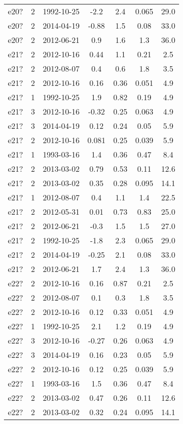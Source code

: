 \begin{table*}[htp]
\begin{tabular}{ccccccc}
e20? & 2 & 1992-10-25 & -2.2 & 2.4 & 0.065 & 29.0 \\
e20? & 2 & 2014-04-19 & -0.88 & 1.5 & 0.08 & 33.0 \\
e20? & 2 & 2012-06-21 & 0.9 & 1.6 & 1.3 & 36.0 \\
e21? & 2 & 2012-10-16 & 0.44 & 1.1 & 0.21 & 2.5 \\
e21? & 2 & 2012-08-07 & 0.4 & 0.6 & 1.8 & 3.5 \\
e21? & 2 & 2012-10-16 & 0.16 & 0.36 & 0.051 & 4.9 \\
e21? & 1 & 1992-10-25 & 1.9 & 0.82 & 0.19 & 4.9 \\
e21? & 3 & 2012-10-16 & -0.32 & 0.25 & 0.063 & 4.9 \\
e21? & 3 & 2014-04-19 & 0.12 & 0.24 & 0.05 & 5.9 \\
e21? & 2 & 2012-10-16 & 0.081 & 0.25 & 0.039 & 5.9 \\
e21? & 1 & 1993-03-16 & 1.4 & 0.36 & 0.47 & 8.4 \\
e21? & 2 & 2013-03-02 & 0.79 & 0.53 & 0.11 & 12.6 \\
e21? & 2 & 2013-03-02 & 0.35 & 0.28 & 0.095 & 14.1 \\
e21? & 1 & 2012-08-07 & 0.4 & 1.1 & 1.4 & 22.5 \\
e21? & 2 & 2012-05-31 & 0.01 & 0.73 & 0.83 & 25.0 \\
e21? & 2 & 2012-06-21 & -0.3 & 1.5 & 1.5 & 27.0 \\
e21? & 2 & 1992-10-25 & -1.8 & 2.3 & 0.065 & 29.0 \\
e21? & 2 & 2014-04-19 & -0.25 & 2.1 & 0.08 & 33.0 \\
e21? & 2 & 2012-06-21 & 1.7 & 2.4 & 1.3 & 36.0 \\
e22? & 2 & 2012-10-16 & 0.16 & 0.87 & 0.21 & 2.5 \\
e22? & 2 & 2012-08-07 & 0.1 & 0.3 & 1.8 & 3.5 \\
e22? & 2 & 2012-10-16 & 0.12 & 0.33 & 0.051 & 4.9 \\
e22? & 1 & 1992-10-25 & 2.1 & 1.2 & 0.19 & 4.9 \\
e22? & 3 & 2012-10-16 & -0.27 & 0.26 & 0.063 & 4.9 \\
e22? & 3 & 2014-04-19 & 0.16 & 0.23 & 0.05 & 5.9 \\
e22? & 2 & 2012-10-16 & 0.12 & 0.25 & 0.039 & 5.9 \\
e22? & 1 & 1993-03-16 & 1.5 & 0.36 & 0.47 & 8.4 \\
e22? & 2 & 2013-03-02 & 0.47 & 0.26 & 0.11 & 12.6 \\
e22? & 2 & 2013-03-02 & 0.32 & 0.24 & 0.095 & 14.1 \\

\end{tabular}
\end{table*}
